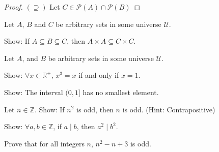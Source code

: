 \documentclass[10pt]{exam}
\begin{document}
\begin{questions}
\begin{proof}
\vspace{10pc}

$(\supseteq)$ Let $C\in \mathcal{P}(A)\cap\mathcal{P}(B)$

\vspace{10pc}

\end{proof}


\question Let $A$, $B$ and $C$ be arbitrary sets in some universe $\mathcal{U}$. 

Show: If $A\subseteq B \subseteq C$, then $A\times A \subseteq C\times C$.
\vspace{10pc}

\newpage

\question Let $A$, and $B$ be arbitrary sets in some universe $\mathcal{U}$.

\question Show: $\forall x\in \mathbb{R}^{+}$, $x^3=x$ if and only if $x=1$.

\newpage
\question Show: The interval $(0,1]$ has no smallest element.
\vspace{11pc}


\question Let $n\in \mathbb{Z}$. Show: If $n^2$ is odd, then $n$ is odd. (Hint: Contrapositive)
\vspace{11pc}


\question Show: $\forall a,b\in \mathbb{Z}$, if $a\mid b$, then $a^2\mid b^2$.
\vspace{11pc}

\question Prove that for all integers $n$, $n^2-n+3$ is odd.
\vspace{11pc}

\newpage
\question 
{}
\newpage


\end{questions}
\end{document}

